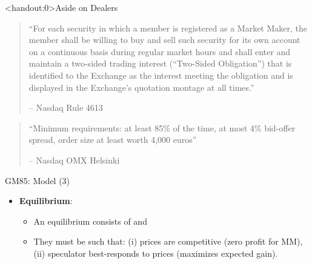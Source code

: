\documentclass[english,10pt
,aspectratio=169
]{beamer}
\begin{document}
\begin{frame}<handout:0>{Aside on Dealers}
	\begin{quotation}
		\small ``For each security in which a member is registered as a Market Maker, the member shall be willing to buy and sell such security for its own account on a continuous basis during regular market hours and shall enter and maintain a two-sided trading interest (``Two-Sided Obligation'') that is identified to the Exchange as the interest meeting the obligation and is displayed in the Exchange's quotation montage at all times.''
		\begin{flushright}
			-- Nasdaq Rule 4613
		\end{flushright}
	\end{quotation}
	\vspace{3ex}
	\begin{quotation}
		\small ``Minimum requirements: at least 85\% of the time, at most 4\% bid-offer
		spread, order size at least worth 4,000 euros''
		\begin{flushright}
			-- Nasdaq OMX Helsinki
		\end{flushright}
	\end{quotation}
\end{frame}


\begin{frame}{GM85: Model (3)}
\begin{itemize}
	\item \textbf{Equilibrium}:
	\begin{itemize}
		\item An equilibrium consists of  and 
		\item They must be such that: (i) prices are competitive (zero profit for MM), (ii) speculator best-responds to prices (maximizes expected gain).
	\end{itemize}
\end{itemize}
\end{frame}


\end{document}
